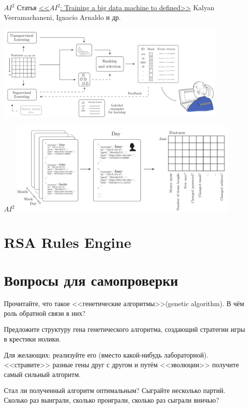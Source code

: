 \begin{frame}{$AI^2$}
	Статья \textcolor{blue}{\href{https://yadi.sk/i/dJ-SrV4y3JFSPV}{<<$AI^2$: Training a big data machine to defined>>}} Kalyan Veeramachaneni, Ignacio Arnaldo и др.
	
		\includegraphics[width=11.5cm]{../pic/ai2_first.png}	
\end{frame}


\begin{frame}{$AI^2$}
	\includegraphics[width=11.5cm]{../pic/ai2_second.png}
\end{frame}




\section{RSA Rules Engine}


  
\section{Вопросы для самопроверки}

\begin{frame}
	Прочитайте, что такое <<генетические алгоритмы>>(genetic algorithm).
	В чём роль обратной связи в них?
	
	Предложите структуру гена генетического алгоритма, создающий стратегии игры в крестики нолики. 
	
	Для желающих: реализуйте его (вместо какой-нибудь лабораторной). 
	<<стравите>> разные гены друг с другом и путём <<эволюции>>
	получите самый сильный алгоритм.
	
	Стал ли полученный алгоритм оптимальным? Сыграйте несколько партий. Сколько раз выиграли, 
	сколько проиграли, сколько раз сыграли вничью?
	
\end{frame}

